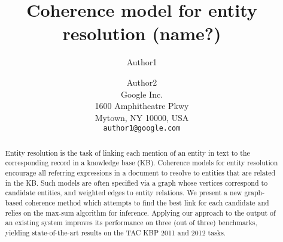 \documentclass[11pt,letterpaper]{article}
\title{Coherence model for entity resolution (name?)}
\author{Author1 \and Author2\\
	    Google Inc. \\
	    1600 Amphitheatre Pkwy\\
	    Mytown, NY 10000, USA\\
	    {\tt author1@google.com}}
\date{}
\begin{document}
\maketitle

\begin{abstract}
Entity resolution is the task of linking each mention of an entity in text to the corresponding record in a knowledge base (KB). Coherence models for entity resolution encourage all referring expressions in a document to resolve to entities that are related in the KB. 
Such models are often specified via a graph whose vertices correspond to candidate entities, and weighted edges to entity relations. We present a new graph-based coherence method which attempts to find the best link for each candidate and relies on the max-sum algorithm for inference.  Applying our approach to the output of an existing system improves its performance on three (out of three) benchmarks, yielding state-of-the-art results on the TAC KBP 2011 and 2012 tasks.
\end{abstract}





\end{document}
